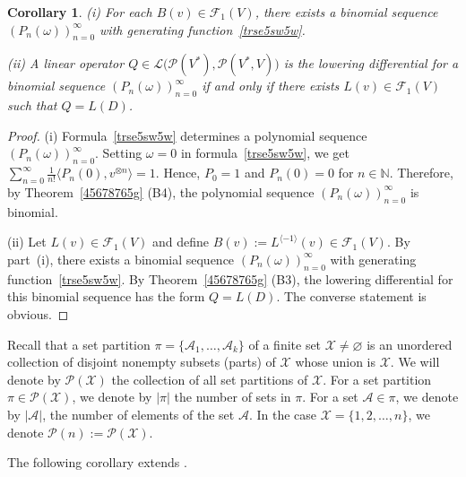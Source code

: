 \documentclass[12pt]{article}
\newtheorem{corollary}[theorem]{Corollary}
\theoremstyle{remark}
\theoremstyle{remark}
\theoremstyle{remark}
\begin{document}
  
  \begin{corollary}\label{crts65sw6ue6u} (i) For each $B(v)\in\mathcal F_1(V)$,  there exists a binomial sequence $(P_n(\omega))_{n=0}^\infty$ with generating function~\eqref{trse5sw5w}.
  
  (ii) A linear operator $Q\in\mathcal L\big(\mathcal P(V^*),\mathcal P(V^*,V)\big)$
is the lowering differential    for a binomial sequence $(P_n(\omega))_{n=0}^\infty$
if and only if there exists $L(v)\in\mathcal F_1(V)$ such that   $Q=L(D)$.  
  \end{corollary}
  
  \begin{proof} (i) Formula~\eqref{trse5sw5w} determines a polynomial sequence $(P_n(\omega))_{n=0}^\infty$. Setting $\omega=0$ in formula~\eqref{trse5sw5w}, we get $\sum_{n=0}^\infty\frac1{n!}\langle P_n(0),v^{\otimes n}\rangle=1$. Hence, $P_0=1$ and $P_n(0)=0$ for $n\in\mathbb N$. Therefore, by Theorem~\ref{45678765g} (B4), the polynomial sequence $(P_n(\omega))_{n=0}^\infty$ is binomial. 
  
 (ii)  Let $L(v)\in\mathcal F_1(V)$ and define $B(v):=L^{\langle-1\rangle}(v)\in\mathcal F_1(V)$. By part~(i), there exists a binomial sequence $(P_n(\omega))_{n=0}^\infty$ with generating function~\eqref{trse5sw5w}. 
By Theorem~\ref{45678765g} (B3), the  lowering differential  for this binomial sequence has the form  $Q=L(D)$. The converse statement is obvious.  
  \end{proof}

Recall that a set partition $\pi=\{\mathcal A_1,\dots, \mathcal A_k\}$ of a finite set $\mathcal X\neq \varnothing$ is an unordered collection of disjoint nonempty subsets (parts) of $\mathcal X$ whose union is $\mathcal X$. We will denote by $\mathcal P(\mathcal X)$ the collection of all set partitions of $\mathcal X$.  For a set partition $\pi\in\mathcal P(\mathcal X)$, we denote by $|\pi|$ the number of sets in $\pi$. For a set $\mathcal A\in\pi$, we denote by $|\mathcal A|$, the number of elements of the set $\mathcal A$.  In the case $\mathcal X=\{1,2,\dots,n\}$, we denote $\mathcal P(n):=\mathcal P(\mathcal X)$.



The following corollary extends \cite[Proposition 5.1]{FKLO}. 
\end{document}

